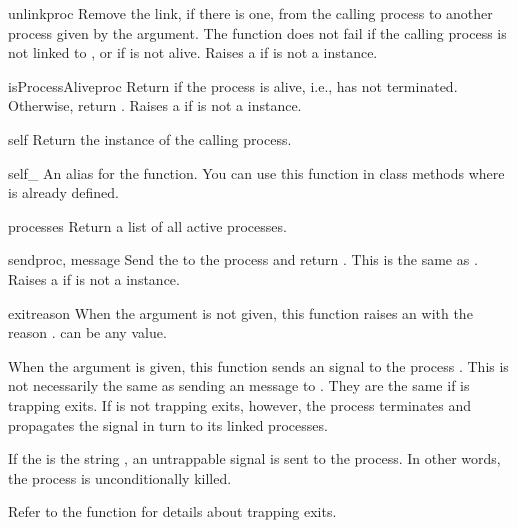 \documentclass{howto}
\begin{document}
\begin{funcdesc}{unlink}{proc}
Remove the link, if there is one, from the calling process to another process
given by the  argument. The function does not fail if the calling
process is not linked to , or if  is not alive. Raises a
  if  is not a 
instance.
\end{funcdesc}

\begin{funcdesc}{isProcessAlive}{proc}
Return  if the process is alive, i.e., has not terminated.
Otherwise, return . Raises a 
 if  is not a  instance.
\end{funcdesc}

\begin{funcdesc}{self}{}
Return the  instance of the calling process.
\end{funcdesc}

\begin{funcdesc}{self_}{}
An alias for the  function. You can use this function in class
methods where  is already defined.
\end{funcdesc}

\begin{funcdesc}{processes}{}
Return a list of all active processes.
\end{funcdesc}

\begin{funcdesc}{send}{proc, message}
Send the  to the  process and return . This
is the same as \code{)}. Raises a
  if  is not a 
instance.
\end{funcdesc}

\begin{funcdesc}{exit}{reason}
When the  argument is not given, this function raises an
 with the reason .  can be any
value.

When the  argument is given, this function sends an 
signal to the process . This is not necessarily the same as sending an
 message to . They are the same if  is trapping
exits. If  is not trapping exits, however, the  process
terminates and propagates the  signal in turn to its linked
processes.

If the  is the string , an untrappable 
signal is sent to the process. In other words, the  process is
unconditionally killed.

Refer to the  function for details about trapping exits.
\end{funcdesc}
\end{document}
